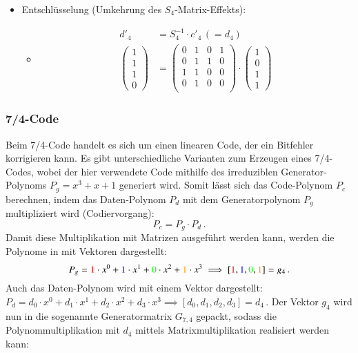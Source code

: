 \begin{itemize}
    \item Entschlüsselung (Umkehrung des $S_4$-Matrix-Effekts):
    \begin{itemize}
        \item[]
        \begin{align*}
            d'_{4}&=S_{4}^{-1} \cdot c'_4 \,(= d_4)\\
            \begin{pmatrix}
                1\\
                1\\
                1\\
                0
            \end{pmatrix}
            &=
            \begin{pmatrix} %
                0 & 1 & 0 & 1\\
                0 & 1 & 1 & 0\\
                1 & 1 & 0 & 0\\
                0 & 1 & 0 & 0\\
            \end{pmatrix}
            \cdot
            \begin{pmatrix} %
                1\\
                0\\
                1\\
                1
            \end{pmatrix}
        \end{align*}
    \end{itemize}
\end{itemize}


\subsubsection{7/4-Code}
Beim 7/4-Code handelt es sich um einen linearen Code,
der ein Bitfehler korrigieren kann.
Es gibt unterschiedliche Varianten zum Erzeugen eines 7/4-Codes,
wobei der hier verwendete Code mithilfe des irreduziblen Generator-Polynoms $P_g = x^3 +x + 1$ generiert wird.
Somit lässt sich das Code-Polynom $P_c$ berechnen, indem das Daten-Polynom $P_d$ mit dem Generatorpolynom $P_g$ multipliziert wird (Codiervorgang):
\[
    P_c=P_g \cdot P_d\,.
\]
Damit diese Multiplikation mit Matrizen ausgeführt werden kann, werden die Polynome in mit Vektoren dargestellt:
\[
    P_g = \textcolor{red}{1}\cdot x^0 + \textcolor{blue}{1}\cdot x^1 + \textcolor{green}{0}\cdot x^2 + \textcolor{orange}{1}\cdot x^3 \implies
    [\textcolor{red}{1}, \textcolor{blue}{1} ,\textcolor{green}{0}, \textcolor{orange}{1}] = g_4\,.
\]
Auch das Daten-Polynom wird mit einem Vektor dargestellt: $P_d = d_0 \cdot x^0 + d_1 \cdot x^1 + d_2 \cdot x^2 + d_3 \cdot x^3 \implies [d_0, d_1, d_2, d_3] = d_4$\,.
Der Vektor $g_4$ wird nun in die sogenannte Generatormatrix $G_{7,4}$ gepackt,
sodass die Polynommultiplikation mit $d_4$ mittels Matrixmultiplikation realisiert werden kann:

